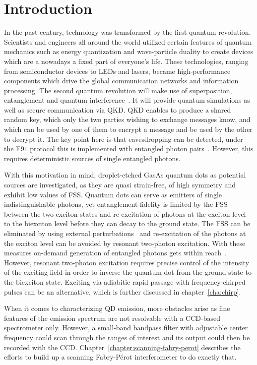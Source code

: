\chapter{Introduction}

In the past century, technology was transformed by the first quantum revolution. Scientists and engineers all around the world utilized certain features of quantum mechanics such as energy quantization and wave-particle duality to create devices which are a nowadays a fixed part of everyone's life.
These technologies, ranging from semiconductor devices to LEDs and lasers, became high-performance components which drive the global communication networks and information processing.
The second quantum revolution will make use of superposition, entanglement and quantum interference~\cite{macfarlane_quantum_2003}.
It will provide quantum simulations as well as secure communication via \ac{QKD}.
\ac{QKD} enables to produce a shared random key, which only the two parties wishing to exchange messages know, and which can be used by one of them to encrypt a message and be used by the other to decrypt it.
The key point here is that eavesdropping can be detected, under the E$91$ protocol this is implemented with entangled photon pairs~\cite{ekert_quantum_1991}.
However, this requires deterministic sources of single entangled photons.

With this motivation in mind, droplet-etched GasAs quantum dots as potential sources are investigated, as they are quasi strain-free, of high symmetry and exhibit low values of \ac{FSS}.
Quantum dots can serve as emitters of single indistinguishable photons, yet entanglement fidelity is limited by the \acs{FSS} between the two exciton states \cite{bayer_fine_2002} and re-excitation of photons at the exciton level to the biexciton level before they can decay to the ground state.
The \ac{FSS} can be eliminated by using external perturbations~\cite{plumhof_experimental_2012} and re-excitation of the photons at the exciton level can be avoided by resonant two-photon excitation.
With these measures on-demand generation of entangled photons gets within reach~\cite{jayakumar_deterministic_2013}.
However, resonant two-photon excitation requires precise control of the intensity of the exciting field in order to inverse the quantum dot from the ground state to the biexciton state.
Exciting via adiabitic rapid passage with frequency-chirped pulses can be an alternative, which is further discussed in chapter~\ref{cha:chirp}.

When it comes to characterizing \ac{QD} emission, more obstacles arise as fine features of the emission spectrum are not resolvable with a CCD-based spectrometer only.
However, a small-band bandpass filter with adjustable center frequency could scan through the ranges of interest and its output could then be recorded with the CCD.
Chapter~\ref{chapter:scanning-fabry-perot} describes the efforts to build up a scanning Fabry-Pérot interferometer to do exactly that.




